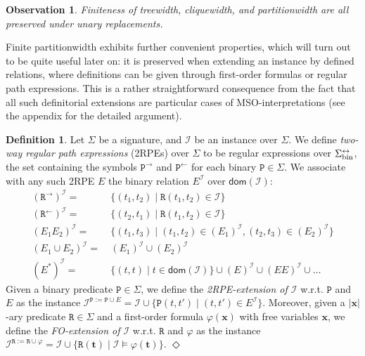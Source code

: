 \documentclass[10pt,a4paper]{amsart}
\theoremstyle{definition}
\numberwithin{equation}{section}
\theoremstyle{plain}
\newtheorem{observation}[observation]{Observation}
\theoremstyle{definition}
\newtheorem{definition}[definition]{Definition}
\theoremstyle{myexample}
\theoremstyle{plain}
\theoremstyle{definition}
\renewcommand{\vec}[1]{\boldsymbol{#1}}
\newcommand{\signature}{\Sigma}
\newcommand{\instance}{\mathcal{I}}
\newcommand{\inst}{\instance}
\newcommand{\adom}[1]{\fcn{dom}(#1)}
\newcommand{\hypercliquewidth}{\partitionwidth}
\newcommand{\partitionwidth}{par\-ti\-tion\-width}
\newcommand{\fcn}[1]{\mathsf{#1}}
\newcommand{\pred}[1]{\mathtt{#1}}
\newcommand{\vx}{\vec{x}}
\newcommand{\vt}{\vec{t}}
\newcommand{\rpred}{\pred{R}}
\newcommand{\ppred}{\pred{P}}
\newcommand{\defend}{\hfill\ensuremath{\Diamond}}
\renewcommand{\phi}{\varphi}
\begin{document}
\begin{observation}\label{prop:unary-replacements}
Finiteness of treewidth, cliquewidth, and \hypercliquewidth{} are all preserved under unary replacements. 
\end{observation}

Finite \hypercliquewidth{} exhibits further convenient properties, which will turn out to be quite useful later on: it is preserved when extending an instance by defined relations, where definitions can be given through first-order formulas or regular path expressions. This is a rather straightforward consequence from the fact that all such definitorial extensions are particular cases of MSO-interpretations (see the appendix for the detailed argument).

\begin{definition}\label{def:extensions}
Let $\signature$ be a signature, and $\inst$ be an instance over $\signature$. 
We define \emph{two-way regular path expressions} (2RPEs) over $\signature$ to be regular expressions over $\signature_{\smash{\mathrm{bin}}}^\leftrightarrow$, the set containing the symbols $\ppred^\rightarrow$ and $\ppred^\leftarrow$ for each binary $\ppred\in \signature$.
We associate with any such 2RPE $E$
the binary relation $E^\instance$ over $\adom{\inst}$:
\begin{align*}
	(\pred{R}^\rightarrow)^\instance = &\ \{(t_1,t_2) \mid \pred{R}(t_1,t_2) \in \instance\} \\[-0.5ex]
	(\pred{R}^\leftarrow)^\instance = &\  \{(t_2,t_1) \mid \pred{R}(t_1,t_2) \in \instance\} \\[-0.5ex]
	(E_1E_2)^\instance = &\  \{(t_1,t_3) \mid (t_1,t_2)\in (E_1)^\instance, (t_2,t_3)\in (E_2)^\instance\}  \\[-0.5ex]
	(E_1 \cup E_2)^\instance = &\  (E_1)^\instance \cup (E_2)^\instance \\[-0.5ex]
	(E^*)^\instance = &\  \{(t,t) \mid t \in \adom{\instance}\} \cup (E)^\instance \cup (EE)^\instance \cup \ldots
\end{align*}
%
Given a binary predicate $\ppred \in \signature$, we define the \emph{2RPE-extension of $\inst$} w.r.t. $\ppred$ and $E$ as the instance $\inst^{\ppred:=\ppred\cup E} = \instance \cup \{\ppred(t,t') \mid (t,t')\in E^\instance \}$.  
%
Moreover, given a $|\vx|$-ary predicate $\rpred \in \signature$ and a first-or\-der formula $\varphi(\vx)$ with free variables $\vx$, we define the \emph{FO-extension of $\inst$} w.r.t. $\rpred$ and $\varphi$ as the instance $\inst^{\rpred:=\rpred\cup\varphi} = \inst \cup \{\rpred(\vt) \mid \inst \models \varphi(\vt)\}$.  \defend
\end{definition} 
\end{document}
